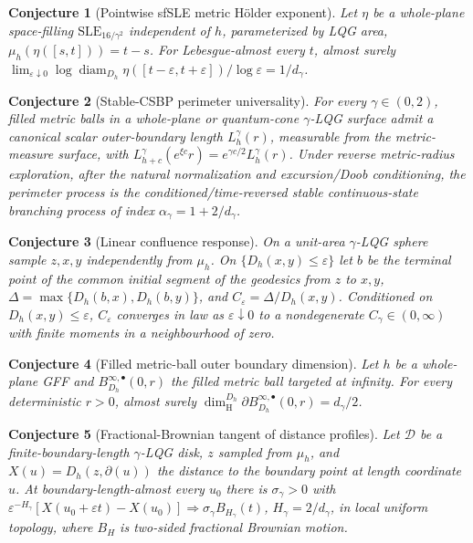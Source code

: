 \documentclass[11pt]{article}
\newtheorem{conjecture}{Conjecture}
\theoremstyle{definition}
\begin{document}
\begin{conjecture}[Pointwise sfSLE metric H\"older exponent]\label{am4}
Let \(\eta\) be a whole-plane space-filling \(\mathrm{SLE}_{16/\gamma^2}\) independent of \(h\), parameterized by LQG area, \(\mu_h(\eta([s,t]))=t-s\).  For Lebesgue-almost every \(t\), almost surely \(\lim_{\varepsilon\downarrow0}\log\operatorname{diam}_{D_h}\eta([t-\varepsilon,t+\varepsilon])/\log\varepsilon=1/d_\gamma\).
\end{conjecture}

\begin{conjecture}[Stable-CSBP perimeter universality]\label{am5}
For every \(\gamma\in(0,2)\), filled metric balls in a whole-plane or quantum-cone \(\gamma\)-LQG surface admit a canonical scalar outer-boundary length \(L_h^\gamma(r)\), measurable from the metric-measure surface, with \(L_{h+c}^\gamma(e^{\xi c}r)=e^{\gamma c/2}L_h^\gamma(r)\).  Under reverse metric-radius exploration, after the natural normalization and excursion/Doob conditioning, the perimeter process is the conditioned/time-reversed stable continuous-state branching process of index \(\alpha_\gamma=1+2/d_\gamma\).
\end{conjecture}

\begin{conjecture}[Linear confluence response]\label{am6}
On a unit-area \(\gamma\)-LQG sphere sample \(z,x,y\) independently from \(\mu_h\).  On \(\{D_h(x,y)\le\varepsilon\}\) let \(b\) be the terminal point of the common initial segment of the geodesics from \(z\) to \(x,y\), \(\Delta=\max\{D_h(b,x),D_h(b,y)\}\), and \(C_\varepsilon=\Delta/D_h(x,y)\).  Conditioned on \(D_h(x,y)\le\varepsilon\), \(C_\varepsilon\) converges in law as \(\varepsilon\downarrow0\) to a nondegenerate \(C_\gamma\in(0,\infty)\) with finite moments in a neighbourhood of zero.
\end{conjecture}

\begin{conjecture}[Filled metric-ball outer boundary dimension]\label{am7}
Let \(h\) be a whole-plane GFF and \(B_{D_h}^{\infty,\bullet}(0,r)\) the filled metric ball targeted at infinity.  For every deterministic \(r>0\), almost surely \(\dim_{\mathrm H}^{D_h}\partial B_{D_h}^{\infty,\bullet}(0,r)=d_\gamma/2\).
\end{conjecture}

\begin{conjecture}[Fractional-Brownian tangent of distance profiles]\label{am8}
Let \(\mathcal D\) be a finite-boundary-length \(\gamma\)-LQG disk, \(z\) sampled from \(\mu_h\), and \(X(u)=D_h(z,\partial(u))\) the distance to the boundary point at length coordinate \(u\).  At boundary-length-almost every \(u_0\) there is \(\sigma_\gamma>0\) with \(\varepsilon^{-H_\gamma}[X(u_0+\varepsilon t)-X(u_0)]\Rightarrow\sigma_\gamma B_{H_\gamma}(t)\), \(H_\gamma=2/d_\gamma\), in local uniform topology, where \(B_H\) is two-sided fractional Brownian motion.
\end{conjecture}
\end{document}
